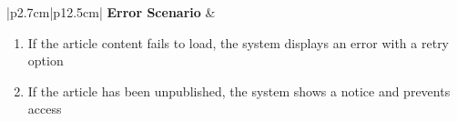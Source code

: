 \begin{table}[H]
\begin{tabular}{|p{2.7cm}|p{12.5cm}|}
            \hline
            \textbf{Error Scenario} & \begin{minipage}[t]{\linewidth}
                                          \begin{enumerate}[topsep=0pt,itemsep=1pt,parsep=0pt,partopsep=0pt]
                                              \item If the article content fails to load, the system displays an error with a retry
                                                    option
                                              \item If the article has been unpublished, the system shows a notice and prevents
                                                    access
                                          \end{enumerate}
                                      \end{minipage}  \\
            \hline
        \end{tabular}
        \label{tab:eng-read-article}
    \end{table}
